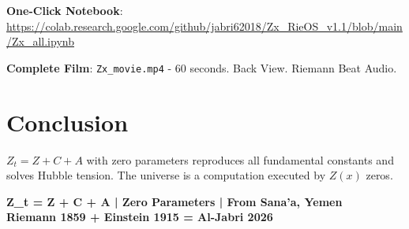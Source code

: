 \documentclass[12pt,a4paper]{article}
\begin{document}
\textbf{One-Click Notebook}: \url{https://colab.research.google.com/github/jabri62018/Zx_RieOS_v1.1/blob/main/Zx_all.ipynb}

\textbf{Complete Film}: \texttt{Zx\_movie.mp4} - 60 seconds. Back View. Riemann Beat Audio.

\section{Conclusion}
$Z_t = Z + C + A$ with zero parameters reproduces all fundamental constants and solves Hubble tension. The universe is a computation executed by $Z(x)$ zeros.

\vspace{1cm}
\begin{center}
\textbf{Z\_t = Z + C + A | Zero Parameters | From Sana'a, Yemen} \\
\textbf{Riemann 1859 + Einstein 1915 = Al-Jabri 2026}
\end{center}
\end{document}
